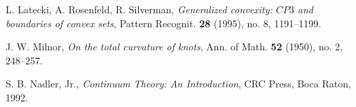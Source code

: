 \documentclass{amsart}
\theoremstyle{definition}
\theoremstyle{remark}
\begin{document}
\begin{thebibliography}{9}

    L. Latecki, A. Rosenfeld, R. Silverman,
    \emph{Generalized convexity: $CP3$ and boundaries of convex sets},
    Pattern Recognit.
    \textbf{28} (1995), no. 8, 1191--1199.

    J. W. Milnor,
    \emph{On the total curvature of knots},
    Ann. of Math.
    \textbf{52} (1950), no. 2, 248--257.

    S. B. Nadler, Jr.,
    \emph{Continuum Theory: An Introduction},
    CRC Press, Boca Raton, 1992.

\end{thebibliography}
\end{document}
